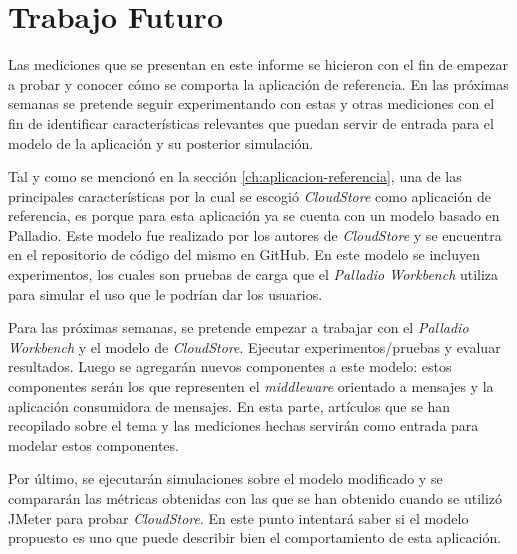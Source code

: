 \documentclass[11pt, twoside]{report}
\begin{document}
\section{Trabajo Futuro}
Las mediciones que se presentan en este informe se hicieron con el fin de empezar a probar y conocer cómo se comporta la aplicación de referencia. En las próximas semanas se pretende seguir experimentando con estas y otras mediciones con el fin de identificar características relevantes que puedan servir de entrada para el modelo de la aplicación y su posterior simulación.

Tal y como se mencionó en la sección \ref{ch:aplicacion-referencia}, una de las principales características por la cual se escogió \emph{CloudStore} como aplicación de referencia, es porque para esta aplicación ya se cuenta con un modelo basado en Palladio. Este modelo fue realizado por los autores de \emph{CloudStore} y se encuentra en el repositorio de código del mismo en GitHub. En este modelo se incluyen experimentos, los cuales son pruebas de carga que el \emph{Palladio Workbench} utiliza para simular el uso que le podrían dar los usuarios. 

Para las próximas semanas, se pretende empezar a trabajar con el \emph{Palladio Workbench} y el modelo de \emph{CloudStore}. Ejecutar experimentos/pruebas y evaluar resultados. Luego se agregarán nuevos componentes a este modelo: estos componentes serán los que representen el \emph{middleware} orientado a mensajes y la aplicación consumidora de mensajes. En esta parte, artículos que se han recopilado sobre el tema y las mediciones hechas servirán como entrada para modelar estos componentes.

Por último, se ejecutarán simulaciones sobre el modelo modificado y se compararán las métricas obtenidas con las que se han obtenido cuando se utilizó JMeter para probar \emph{CloudStore}. En este punto intentará saber si el modelo propuesto es uno que puede describir bien el comportamiento de esta aplicación.
\end{document}
